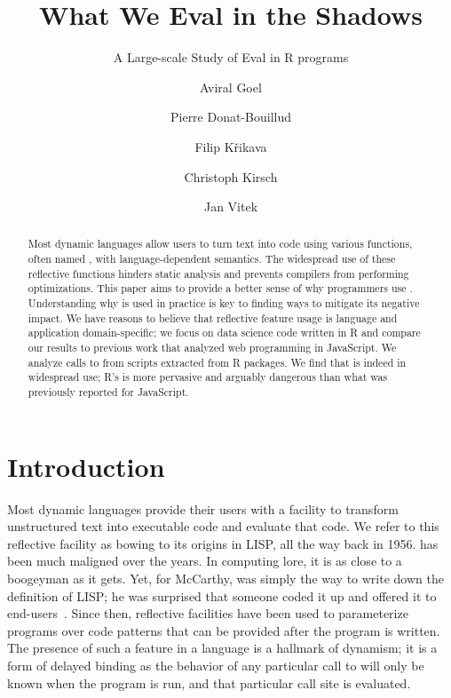 \documentclass[review,screen,acmsmall]{acmart}%
\begin{document}
\title{What We Eval in the Shadows}
\subtitle{A Large-scale Study of Eval in R programs}

\author{Aviral Goel}
\author{Pierre Donat-Bouillud}
\author{Filip Křikava}
\author{Christoph Kirsch}
\author{Jan Vitek}

\begin{abstract}
  Most dynamic languages allow users to turn text into code using various
  functions, often named \eval, with language-dependent semantics. The
  widespread use of these reflective functions hinders static analysis and
  prevents compilers from performing optimizations. This paper aims to provide a
  better sense of why programmers use \eval. Understanding why \eval is used in
  practice is key to finding ways to mitigate its negative impact. We have
  reasons to believe that reflective feature usage is language and application
  domain-specific; we focus on data science code written in R and compare our
  results to previous work that analyzed web programming in JavaScript. We
  analyze \packageAllcalls calls to \eval from \CranRunnableScripts scripts
  extracted from \CranPackages R packages. We find that \eval is indeed in
  widespread use; R's \eval is more pervasive and arguably dangerous than what
  was previously reported for JavaScript.
\end{abstract}

\maketitle
\renewcommand{\shortauthors}{Goel et al.}
\renewcommand{\shorttitle}{What We Eval in the Shadows}

\section{Introduction}

Most dynamic languages provide their users with a facility to transform
unstructured text into executable code and evaluate that code. We refer to this
reflective facility as \eval bowing to its origins in LISP, all the way back in
1956. \Eval has been much maligned over the years. In computing lore, it is as
close to a boogeyman as it gets. Yet, for McCarthy, \eval was simply the way to
write down the definition of LISP; he was surprised that someone coded it up and
offered it to end-users~\cite{lisp}. Since then, reflective facilities have been
used to parameterize programs over code patterns that can be provided after the
program is written. The presence of such a feature in a language is a hallmark
of dynamism; it is a form of delayed binding as the behavior of any particular
call to \eval will only be known when the program is run, and that particular
call site is evaluated.
\end{document}
